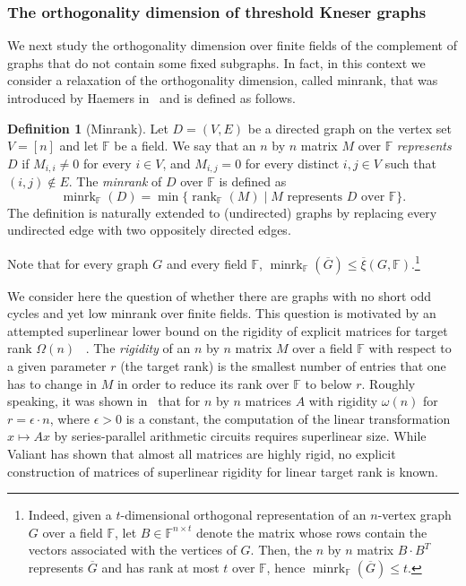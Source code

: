 \documentclass[11pt]{article}
\numberwithin{equation}{section}
\theoremstyle{definition}
\newtheorem{definition}[theorem]{Definition}
\theoremstyle{plain}
\newcommand{\Fset}{\mathbb{F}}
\newcommand{\od}{\overline{\xi}}
\newcommand{\eps}{\epsilon}
\newcommand{\rank}{\mathop{\mathrm{rank}}}
\newcommand{\minrank}{\mathop{\mathrm{minrk}}}
\begin{document}
%
\subsubsection{The orthogonality dimension of threshold Kneser graphs}
%

We next
%
%
study
the orthogonality dimension over finite fields of the complement of graphs that do not contain some fixed subgraphs.
In fact, in this context we consider %
%
a relaxation %
of the orthogonality dimension,
%
%
%
%
called minrank, that was introduced by Haemers in~\cite{Haemers79, Haemers81} and is defined as follows.

\begin{definition}[Minrank]\label{def:minrank}
Let $D=(V,E)$ be a directed graph on the vertex set $V=[n]$ and let $\Fset$ be a field.
We say that an $n$ by $n$ matrix $M$ over $\Fset$ \emph{represents} $D$ if $M_{i,i} \neq 0$ for every $i \in V$, and $M_{i,j}=0$ for every distinct $i,j \in V$ such that $(i,j) \notin E$.
The \emph{minrank} of $D$ over $\Fset$ is defined as
\[{\minrank}_{\Fset}(D) =  \min\{{\rank}_{\Fset}(M)\mid M \mbox{ represents }D\mbox{ over }\Fset\}.\]
The definition is naturally extended to (undirected) graphs by replacing every undirected edge with two oppositely directed edges.
\end{definition}
\noindent
Note that for every graph $G$ and every field $\Fset$, ${\minrank}_{\Fset}(\overline{G}) \leq \od(G,\Fset)$.\footnote{Indeed, given a $t$-dimensional orthogonal representation of an $n$-vertex graph $G$ over a field $\Fset$,
%
%
let $B \in \Fset^{n \times t}$ denote the matrix
whose rows contain the vectors associated with the vertices of $G$. Then, the $n$ by $n$ matrix $B \cdot B^T$ represents $\overline{G}$ and has rank at most $t$ over $\Fset$, hence ${\minrank}_{\Fset}(\overline{G}) \leq t$.}

%
%

We consider here the question of whether there are graphs with no short odd cycles and yet low minrank over finite fields.
%
%
This question is motivated by an attempted superlinear lower bound on the rigidity of explicit matrices
for target rank $\Omega(n)$%
%
%
~\cite{CodenottiPR00}. The \emph{rigidity} of an $n$ by $n$ matrix $M$ over a field $\Fset$ with respect to a given parameter $r$
(the target rank)  %
%
is the smallest number of entries that one has to change in $M$ in order to reduce its rank over $\Fset$ to below $r$.
%
Roughly speaking, it was shown in~\cite{Valiant77,C08} that
%
%
%
for $n$ by $n$ matrices $A$ with rigidity $\omega(n)$
for $r = \eps \cdot n$, where $\eps> 0$ is a constant,
the computation of the linear transformation $x\mapsto Ax$
%
%
%
%
by series-parallel arithmetic circuits requires superlinear size.
While Valiant has shown that almost all matrices are highly rigid,
%
%
no explicit construction of matrices
%
%
of superlinear rigidity for linear target rank is known.  %
\end{document}
